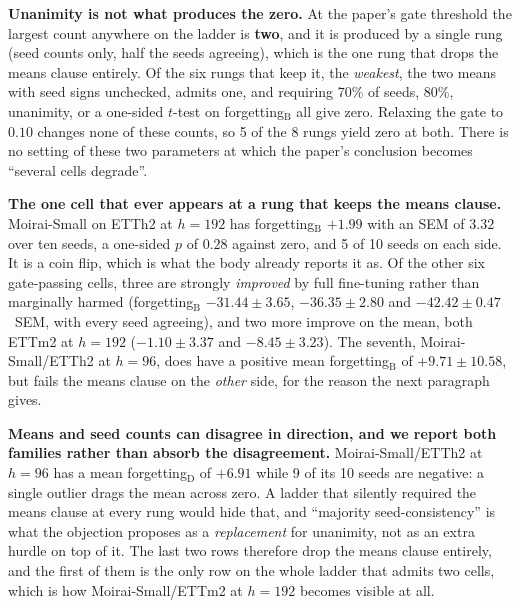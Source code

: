 \textbf{Unanimity is not what produces the zero.} At the paper's gate threshold
the largest count anywhere on the ladder is \textbf{two}, and it is produced by a
single rung (seed counts only, half the seeds agreeing), which is the one rung
that drops the means clause entirely. Of the six rungs that keep it, the
\emph{weakest}, the two means with seed signs unchecked, admits one, and requiring
70\% of seeds, 80\%, unanimity, or a one-sided $t$-test on forgetting$_\text{B}$
all give zero. Relaxing the gate to $0.10$ changes none of these counts, so 5 of
the 8 rungs yield zero at both. There is no setting of these two parameters at which the paper's
conclusion becomes ``several cells degrade''.

\textbf{The one cell that ever appears at a rung that keeps the means clause.}
Moirai-Small on ETTh2 at $h{=}192$ has
forgetting$_\text{B}$ $+1.99$ with an SEM of $3.32$ over ten seeds, a one-sided
$p$ of $0.28$ against zero, and 5 of 10 seeds on each side. It is a coin flip,
which is what the body already reports it as. Of the other six gate-passing
cells, three are strongly \emph{improved} by full fine-tuning rather than
marginally harmed (forgetting$_\text{B}$ $-31.44{\pm}3.65$, $-36.35{\pm}2.80$
and $-42.42{\pm}0.47$~SEM, with every seed agreeing), and two more improve on the
mean, both ETTm2 at $h{=}192$ ($-1.10{\pm}3.37$ and $-8.45{\pm}3.23$). The
seventh, Moirai-Small/ETTh2 at $h{=}96$, does have a positive mean
forgetting$_\text{B}$ of $+9.71{\pm}10.58$, but fails the means clause on the
\emph{other} side, for the reason the next paragraph gives.

\textbf{Means and seed counts can disagree in direction, and we report both
families rather than absorb the disagreement.} Moirai-Small/ETTh2 at $h{=}96$ has
a mean forgetting$_\text{D}$ of $+6.91$ while 9 of its 10 seeds are negative: a
single outlier drags the mean across zero. A ladder that silently required the
means clause at every rung would hide that, and ``majority seed-consistency'' is
what the objection proposes as a \emph{replacement} for unanimity, not as an
extra hurdle on top of it. The last two rows therefore drop the means clause
entirely, and the first of them is the only row on the whole ladder that admits
two cells, which is how Moirai-Small/ETTm2 at $h{=}192$ becomes visible at all.

